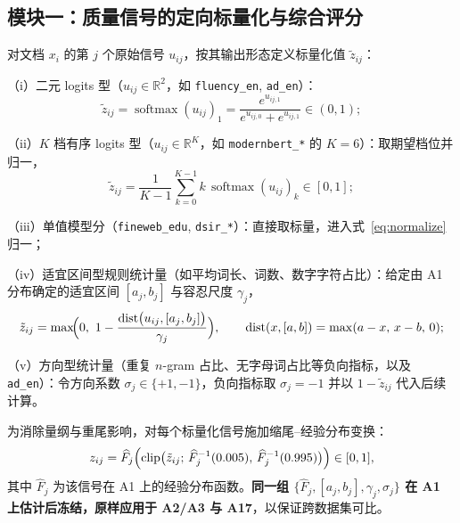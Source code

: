 \subsection{模块一：质量信号的定向标量化与综合评分}\label{sec:p1-quality}

\begin{definition}[定向标量化算子]\label{def:scalarize}
对文档 $x_i$ 的第 $j$ 个原始信号 $u_{ij}$，按其输出形态定义标量化值 $\tilde z_{ij}$：

（i）二元 logits 型（$u_{ij}\in\mathbb{R}^2$，如 \texttt{fluency\_en}, \texttt{ad\_en}）：
\begin{equation}
  \tilde z_{ij}=\operatorname{softmax}(u_{ij})_{1}
  =\frac{e^{u_{ij,1}}}{e^{u_{ij,0}}+e^{u_{ij,1}}}\in(0,1);
  \label{eq:binary-logit}
\end{equation}

（ii）$K$ 档有序 logits 型（$u_{ij}\in\mathbb{R}^K$，如 \texttt{modernbert\_*} 的 $K=6$）：取期望档位并归一，
\begin{equation}
  \tilde z_{ij}=\frac{1}{K-1}\sum_{k=0}^{K-1} k\,\operatorname{softmax}(u_{ij})_{k}\in[0,1];
  \label{eq:ordinal-logit}
\end{equation}

（iii）单值模型分（\texttt{fineweb\_edu}, \texttt{dsir\_*}）：直接取标量，进入式~\eqref{eq:normalize} 归一；

（iv）适宜区间型规则统计量（如平均词长、词数、数字字符占比）：给定由 A1 分布确定的适宜区间 $[a_j,b_j]$ 与容忍尺度 $\gamma_j$，
\begin{equation}
  \tilde z_{ij}=\max\!\Bigl(0,\ 1-\frac{\operatorname{dist}\bigl(u_{ij},[a_j,b_j]\bigr)}{\gamma_j}\Bigr),
  \qquad
  \operatorname{dist}(x,[a,b])=\max(a-x,\,x-b,\,0);
  \label{eq:interval}
\end{equation}

（v）方向型统计量（重复 $n$-gram 占比、无字母词占比等负向指标，以及 \texttt{ad\_en}）：令方向系数 $\sigma_j\in\{+1,-1\}$，负向指标取 $\sigma_j=-1$ 并以 $1-\tilde z_{ij}$ 代入后续计算。
\end{definition}

\begin{definition}[稳健归一化]\label{def:normalize}
为消除量纲与重尾影响，对每个标量化信号施加缩尾--经验分布变换：
\begin{equation}
  z_{ij}
  =\widehat F_{j}\Bigl(\operatorname{clip}\bigl(\tilde z_{ij};\,
  \widehat F_{j}^{-1}(0.005),\,\widehat F_{j}^{-1}(0.995)\bigr)\Bigr)\in[0,1],
  \label{eq:normalize}
\end{equation}
其中 $\widehat F_j$ 为该信号在 A1 上的经验分布函数。\textbf{同一组 $\{\widehat F_j,[a_j,b_j],\gamma_j,\sigma_j\}$ 在 A1 上估计后冻结，原样应用于 A2/A3 与 A17}，以保证跨数据集可比。
\end{definition}

